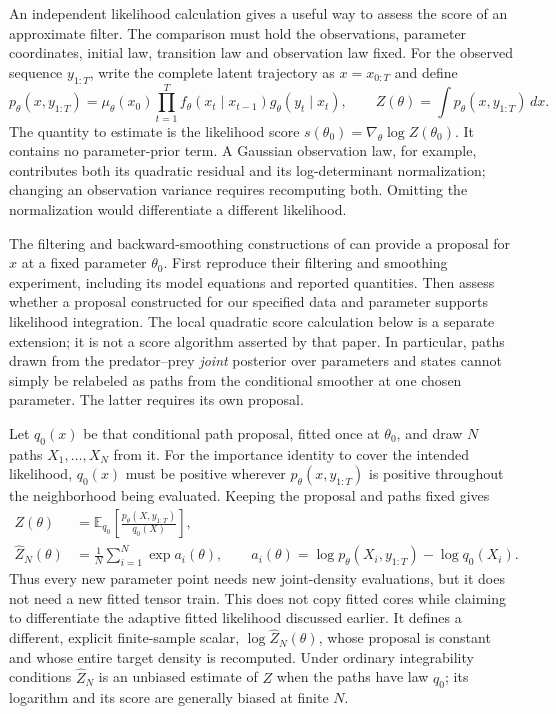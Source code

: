 An independent likelihood calculation gives a useful way to assess the score of
an approximate filter.  The comparison must hold the observations, parameter
coordinates, initial law, transition law and observation law fixed.  For the
observed sequence $y_{1:T}$, write the complete latent trajectory as
$x=x_{0:T}$ and define
\begin{equation}
  p_\theta(x,y_{1:T})
  =\mu_\theta(x_0)\prod_{t=1}^T
       f_\theta(x_t\mid x_{t-1})g_\theta(y_t\mid x_t),
  \qquad
  Z(\theta)=\int p_\theta(x,y_{1:T})\,dx.
  \label{eq:bf-hd-reference-path-target}
\end{equation}
The quantity to estimate is the likelihood score
$s(\theta_0)=\nabla_\theta\log Z(\theta_0)$.  It contains no parameter-prior
term.  A Gaussian observation law, for example, contributes both its quadratic
residual and its log-determinant normalization; changing an observation variance
requires recomputing both.  Omitting the normalization would differentiate a
different likelihood.

The filtering and backward-smoothing constructions of
\citet[Algorithms 1, 2 and 4]{zhao2024ttsequential} can provide a proposal for
$x$ at a fixed parameter $\theta_0$.  First reproduce their filtering and
smoothing experiment, including its model equations and reported quantities.
Then assess whether a proposal constructed for our specified data and parameter
supports likelihood integration.  The local quadratic score calculation below
is a separate extension; it is not a score algorithm asserted by that paper.
In particular, paths drawn from the predator--prey \emph{joint} posterior over
parameters and states cannot simply be relabeled as paths from the conditional
smoother at one chosen parameter.  The latter requires its own proposal.

Let $q_0(x)$ be that conditional path proposal, fitted once at $\theta_0$, and
draw $N$ paths $X_1,\ldots,X_N$ from it.  For the importance identity to cover
the intended likelihood, $q_0(x)$ must be positive wherever
$p_\theta(x,y_{1:T})$ is positive throughout the neighborhood being evaluated.
Keeping the proposal and paths fixed gives
\begin{align}
  Z(\theta)
    &=\mathbb E_{q_0}\!\left[
        \frac{p_\theta(X,y_{1:T})}{q_0(X)}\right],
       \label{eq:bf-hd-reference-importance-identity}\\
  \widehat Z_N(\theta)
    &=\frac1N\sum_{i=1}^N \exp a_i(\theta),
  \qquad
  a_i(\theta)=\log p_\theta(X_i,y_{1:T})-\log q_0(X_i).
       \label{eq:bf-hd-reference-importance-estimate}
\end{align}
Thus every new parameter point needs new joint-density evaluations, but it does
not need a new fitted tensor train.  This does not copy fitted cores while
claiming to differentiate the adaptive fitted likelihood discussed earlier.
It defines a different, explicit finite-sample scalar,
$\log\widehat Z_N(\theta)$, whose proposal is constant and whose entire target
density is recomputed.  Under ordinary integrability conditions
$\widehat Z_N$ is an unbiased estimate of $Z$ when the paths have law $q_0$;
its logarithm and its score are generally biased at finite $N$.

